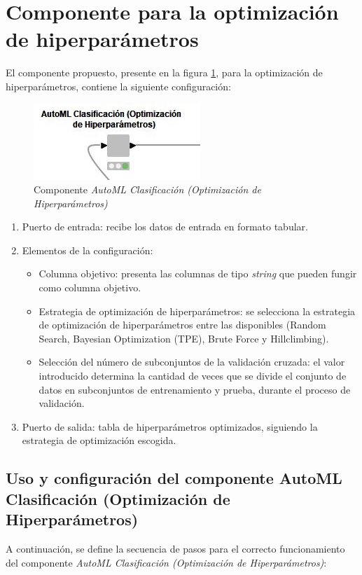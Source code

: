 \section{Componente para la optimización de hiperparámetros}
El componente propuesto, presente en la figura \ref{fig:automl-componente-hpo}, para la optimización de hiperparámetros, contiene la siguiente configuración:
\begin{figure}[H]
	\centering
	\includegraphics[width=0.35\linewidth]{"figuras/capi 2/automl-componente-hpo"}
	\caption[Componente AutoML Clasificación (Optimización de Hiperparámetros)]{Componente \textit{AutoML Clasificación (Optimización de Hiperparámetros)}}
	\label{fig:automl-componente-hpo}
\end{figure}
\begin{enumerate}
	\item Puerto de entrada: recibe los datos de entrada en formato tabular.
	\item Elementos de la configuración:
	\begin{itemize}
		\item Columna objetivo: presenta las columnas de tipo \textit{string} que pueden fungir como columna objetivo.
		\item Estrategia de optimización de hiperparámetros: se selecciona la estrategia de optimización de hiperparámetros entre las disponibles (Random Search, Bayesian Optimization (TPE), Brute Force y Hillclimbing).
		\item Selección del número de subconjuntos de la validación cruzada: el valor introducido determina la cantidad de veces que se divide el conjunto de datos en subconjuntos de entrenamiento y prueba, durante el proceso de validación.
	\end{itemize}
	\item Puerto de salida: tabla de hiperparámetros optimizados, siguiendo la estrategia de optimización escogida.
\end{enumerate}

\subsection{Uso y configuración del componente AutoML Clasificación (Optimización de Hiperparámetros)}
A continuación, se define la secuencia de pasos para el correcto funcionamiento del componente \textit{AutoML Clasificación (Optimización de Hiperparámetros)}:

